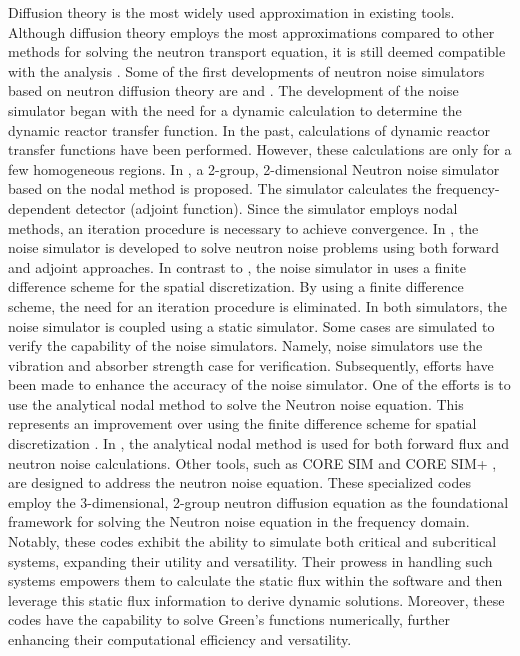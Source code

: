 Diffusion theory is the most widely used approximation in existing tools. Although diffusion theory employs the most approximations compared to other methods for solving the neutron transport equation, it is still deemed compatible with the analysis \cite{duderstadtNuclearReactorAnalysis1977, demaziereNumericalToolsApplied2009}. Some of the first developments of neutron noise simulators based on neutron diffusion theory are \cite{kherichaDevelopmentTwoenergyGroup2001} and \cite{demaziereDevelopment2D2group2004}. The development of the noise simulator began with the need for a dynamic calculation to determine the dynamic reactor transfer function. In the past, calculations of dynamic reactor transfer functions have been performed. However, these calculations are only for a few homogeneous regions. In \cite{kherichaDevelopmentTwoenergyGroup2001}, a 2-group, 2-dimensional Neutron noise simulator based on the nodal method is proposed. The simulator calculates the frequency-dependent detector (adjoint function). Since the simulator employs nodal methods, an iteration procedure is necessary to achieve convergence. In \cite{demaziereDevelopment2D2group2004}, the noise simulator is developed to solve neutron noise problems using both forward and adjoint approaches. In contrast to \cite{kherichaDevelopmentTwoenergyGroup2001}, the noise simulator in \cite{demaziereDevelopment2D2group2004} uses a finite difference scheme for the spatial discretization. By using a finite difference scheme, the need for an iteration procedure is eliminated. In both simulators, the noise simulator is coupled using a static simulator. Some cases are simulated to verify the capability of the noise simulators. Namely, noise simulators use the vibration and absorber strength case for verification. Subsequently, efforts have been made to enhance the accuracy of the noise simulator. One of the efforts is to use the analytical nodal method \cite{smithAnalyticNodalMethod1979} to solve the Neutron noise equation. This represents an improvement over using the finite difference scheme for spatial discretization \cite{larssonNeutronNoiseCalculations2011}. In \cite{larssonNeutronNoiseCalculations2011}, the analytical nodal method is used for both forward flux and neutron noise calculations. Other tools, such as CORE SIM \cite{demaziereCORESIMMultipurpose2011, dykinDEMONSTRATIONCOUPLEDCORE2014} and CORE SIM+ \cite{mylonakisCORESIMFlexible2021, mylonakisNeutronNoiseModelling2019, mylonakisNumericalSolutionTwoenergygroup2020}, are designed to address the neutron noise equation. These specialized codes employ the 3-dimensional, 2-group neutron diffusion equation as the foundational framework for solving the Neutron noise equation in the frequency domain. Notably, these codes exhibit the ability to simulate both critical and subcritical systems, expanding their utility and versatility. Their prowess in handling such systems empowers them to calculate the static flux within the software and then leverage this static flux information to derive dynamic solutions. Moreover, these codes have the capability to solve Green's functions numerically, further enhancing their computational efficiency and versatility.

